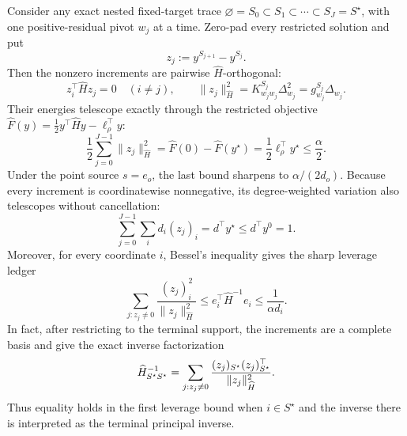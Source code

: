 \begin{proposition}
\label{prop:aesp-cd-point-source-orthogonal-pivots}
Consider any exact nested fixed-target trace
\(\varnothing=S_0\subset S_1\subset\cdots\subset S_J=S^\star\), with one
positive-residual pivot \(w_j\) at a time.  Zero-pad every restricted
solution and put
\begin{equation*}
 z_j:=y^{S_{j+1}}-y^{S_j}.
\end{equation*}
Then the nonzero increments are pairwise \(\widehat H\)-orthogonal:
\begin{equation}
 z_i^\top\widehat H z_j=0\quad(i\ne j),
 \qquad
 \|z_j\|_{\widehat H}^2
 =K^{S_j}_{w_jw_j}\Delta_{w_j}^2
 =g^{S_j}_{w_j}\Delta_{w_j}.
 \label{eq:aesp-cd-point-source-pivot-orthogonality}
\end{equation}
Their energies telescope exactly through the restricted objective
\(\widehat F(y)=\tfrac12y^\top\widehat Hy-\ell_\rho^\top y\):
\begin{equation}
 \frac12\sum_{j=0}^{J-1}\|z_j\|_{\widehat H}^2
 =\widehat F(0)-\widehat F(y^\star)
 =\frac12\ell_\rho^\top y^\star
 \leq\frac{\alpha}{2}.
 \label{eq:aesp-cd-point-source-pivot-energy}
\end{equation}
Under the point source $s=e_o$, the last bound sharpens to
\(\alpha/(2d_o)\).
Because every increment is coordinatewise nonnegative, its degree-weighted
variation also telescopes without cancellation:
\begin{equation}
 \sum_{j=0}^{J-1}\sum_i d_i(z_j)_i
 =d^\top y^\star\leq d^\top y^0=1.
 \label{eq:aesp-cd-point-source-pivot-variation}
\end{equation}
Moreover, for every coordinate \(i\), Bessel's inequality gives the sharp
leverage ledger
\begin{equation}
 \sum_{j:z_j\ne0}
 \frac{(z_j)_i^2}{\|z_j\|_{\widehat H}^2}
 \leq e_i^\top\widehat H^{-1}e_i
 \leq\frac1{\alpha d_i}.
 \label{eq:aesp-cd-point-source-pivot-bessel}
\end{equation}
In fact, after restricting to the terminal support, the increments are a
complete basis and give the exact inverse factorization
\begin{equation}
 \widehat H_{S^\star S^\star}^{-1}
 =\sum_{j:z_j\ne0}
   \frac{(z_j)_{S^\star}(z_j)_{S^\star}^\top}
        {\lVert z_j\rVert_{\widehat H}^2}.
 \label{eq:aesp-cd-pivot-inverse-factorization}
\end{equation}
Thus equality holds in the first leverage bound when $i\in S^\star$ and
the inverse there is interpreted as the terminal principal inverse.


\end{proposition}
